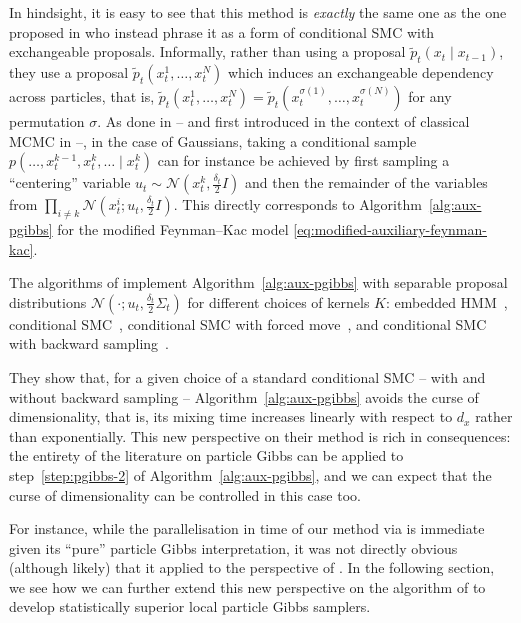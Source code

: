 In hindsight, it is easy to see that this method is \emph{exactly} the same one as the one proposed in \citet[Algorithm 3 and extensions]{finke2021csmc} who instead phrase it as a form of conditional SMC with exchangeable proposals. Informally, rather than using a proposal $\tilde{p}_t(x_t \mid x_{t-1})$, they use a proposal $\tilde{p}_t(x^1_t, \ldots, x^N_t)$ which induces an exchangeable dependency across particles, that is, $\tilde{p}_t(x^1_t, \ldots, x^N_t) = \tilde{p}_t(x^{\sigma(1)}_t, \ldots, x^{\sigma(N)}_t)$ for any permutation $\sigma$. As done in \citet{finke2021csmc} -- and first introduced in the context of classical MCMC in \citet{tjelmeland2004using} --, in the case of Gaussians, taking a conditional sample $p(\ldots, x^{k-1}_t, x^k_t, \ldots\mid x^k_t)$ can for instance be achieved by first sampling a ``centering'' variable $u_t \sim \mathcal{N}(x^k_t, \frac{\delta_t}{2}I)$ and then the remainder of the variables from $\prod_{i\neq k} \mathcal{N}(x_t^i; u_t, \frac{\delta_t}{2}I)$. This directly corresponds to Algorithm~\ref{alg:aux-pgibbs} for the modified Feynman--Kac model \eqref{eq:modified-auxiliary-feynman-kac}.
\begin{proposition}
    \label{prop:finke-equivalence}
    The algorithms of \citet{finke2021csmc} implement Algorithm~\ref{alg:aux-pgibbs} with separable proposal distributions $\mathcal{N}\left(\cdot; u_t, \frac{\delta_t}{2} \Sigma_t\right)$ for different choices of kernels $K$: embedded HMM~\citep{neal2003embedded}, conditional SMC~\citep{Andrieu2010particle}, conditional SMC with forced move~\citep{Chopin2015particle}, and conditional SMC with backward sampling~\citep{whiteley2010discussion}.
\end{proposition}
They show that, for a given choice of a standard conditional SMC -- with and without backward sampling -- Algorithm~\ref{alg:aux-pgibbs} avoids the curse of dimensionality, that is, its mixing time increases linearly with respect to $d_x$ rather than exponentially.
This new perspective on their method is rich in consequences: the entirety of the literature on particle Gibbs can be applied to step~\ref{step:pgibbs-2} of Algorithm~\ref{alg:aux-pgibbs}, and we can expect that the curse of dimensionality can be controlled in this case too.

For instance, while the parallelisation in time of our method via \citet{corenflos2022sequentialized} is immediate given its ``pure'' particle Gibbs interpretation, it was not directly obvious (although likely) that it applied to the perspective of \citet[][Propositions 4.1, 4.2, and 4.3]{finke2021csmc}. In the following section, we see how we can further extend this new perspective on the algorithm of \citet{finke2021csmc} to develop statistically superior local particle Gibbs samplers.



